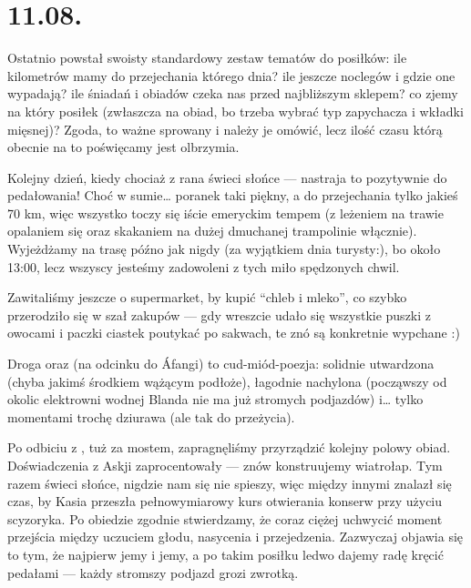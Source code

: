 \chapter*{11.08.}


Ostatnio powstał swoisty standardowy zestaw tematów do posiłków: ile kilometrów mamy do przejechania którego dnia? ile jeszcze noclegów i gdzie one wypadają? ile śniadań i obiadów czeka nas przed najbliższym sklepem? co zjemy na który posiłek (zwłaszcza na obiad, bo trzeba wybrać typ zapychacza i wkładki mięsnej)? Zgoda, to ważne sprowany i należy je omówić, lecz ilość czasu którą obecnie na to poświęcamy jest olbrzymia.

Kolejny dzień, kiedy chociaż z rana świeci słońce --- nastraja to pozytywnie do pedałowania! Choć w sumie… poranek taki piękny, a do przejechania tylko jakieś 70 km, więc wszystko toczy się iście emeryckim tempem (z leżeniem na trawie opalaniem się oraz skakaniem na dużej dmuchanej trampolinie włącznie). Wyjeżdżamy na trasę późno jak nigdy (za wyjątkiem dnia turysty:), bo około 13:00, lecz  wszyscy jesteśmy zadowoleni z tych miło spędzonych chwil.


Zawitaliśmy jeszcze o supermarket, by kupić “chleb i mleko”, co szybko przerodziło się w szał zakupów --- gdy wreszcie udało się wszystkie puszki z owocami i paczki ciastek poutykać po sakwach, te znó są konkretnie wypchane :)

Droga  oraz  (na odcinku do Áfangi) to cud-miód-poezja: solidnie utwardzona (chyba jakimś środkiem wążącym podłoże), łagodnie nachylona (począwszy od okolic elektrowni wodnej Blanda nie ma już stromych podjazdów) i… tylko momentami trochę dziurawa (ale tak do przeżycia).

Po odbiciu z , tuż za mostem, zapragnęliśmy przyrządzić kolejny polowy obiad. Doświadczenia z Askji zaprocentowały --- znów konstruujemy wiatrołap. Tym razem świeci słońce, nigdzie nam się nie spieszy, więc między innymi znalazł się czas, by Kasia przeszła pełnowymiarowy kurs otwierania konserw przy użyciu scyzoryka. Po obiedzie zgodnie stwierdzamy, że coraz ciężej uchwycić moment przejścia między uczuciem głodu, nasycenia i przejedzenia. Zazwyczaj objawia się to tym, że najpierw jemy i jemy, a po takim posiłku ledwo dajemy radę kręcić pedałami --- każdy stromszy podjazd grozi zwrotką.

